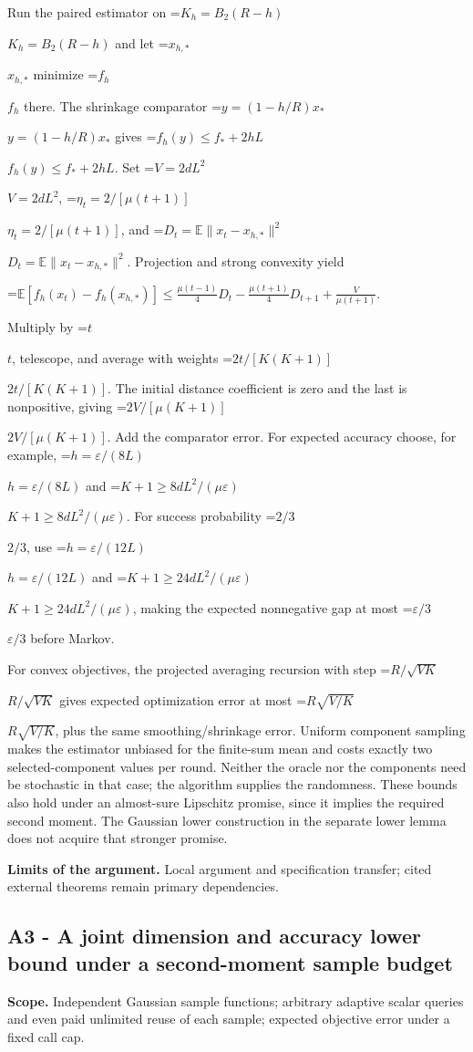 \documentclass[10pt,a4paper]{article}
\newcommand{\AtlasMath}[1]{\par\begingroup\centering\setbox0=\hbox{$\displaystyle #1$}\ifdim\wd0>1.4\linewidth\typeout{ATLAS WIDE FORMULA: \the\wd0}\fi\ifdim\wd0>\linewidth\resizebox{\linewidth}{!}{\box0}\else\box0\fi\par\endgroup}
\newcommand{\AtlasInlineMath}[1]{\begingroup\setbox0=\hbox{$#1$}\ifdim\wd0>.4\linewidth\endgroup\AtlasMath{#1}\else\endgroup$#1$\fi}
\begin{document}
Run the paired estimator on \AtlasInlineMath{K_h=B_2(R-h)} and let \AtlasInlineMath{x_{h,*}} minimize \AtlasInlineMath{f_h} there. The shrinkage comparator \AtlasInlineMath{y=(1-h/R)x_*} gives \AtlasInlineMath{f_h(y)\le f_*+2hL}. Set \AtlasInlineMath{V=2dL^2}, \AtlasInlineMath{\eta_t=2/[\mu(t+1)]}, and \AtlasInlineMath{D_t=\mathbb E\|x_t-x_{h,*}\|^2}. Projection and strong convexity yield

\AtlasMath{\mathbb E[f_h(x_t)-f_h(x_{h,*})]\le\frac{\mu(t-1)}4D_t-\frac{\mu(t+1)}4D_{t+1}+\frac{V}{\mu(t+1)}.}

Multiply by \AtlasInlineMath{t}, telescope, and average with weights \AtlasInlineMath{2t/[K(K+1)]}. The initial distance coefficient is zero and the last is nonpositive, giving \AtlasInlineMath{2V/[\mu(K+1)]}. Add the comparator error. For expected accuracy choose, for example, \AtlasInlineMath{h=\varepsilon/(8L)} and \AtlasInlineMath{K+1\ge8dL^2/(\mu\varepsilon)}. For success probability \AtlasInlineMath{2/3}, use \AtlasInlineMath{h=\varepsilon/(12L)} and \AtlasInlineMath{K+1\ge24dL^2/(\mu\varepsilon)}, making the expected nonnegative gap at most \AtlasInlineMath{\varepsilon/3} before Markov.

For convex objectives, the projected averaging recursion with step \AtlasInlineMath{R/\sqrt{VK}} gives expected optimization error at most \AtlasInlineMath{R\sqrt{V/K}}, plus the same smoothing/shrinkage error. Uniform component sampling makes the estimator unbiased for the finite-sum mean and costs exactly two selected-component values per round. Neither the oracle nor the components need be stochastic in that case; the algorithm supplies the randomness. These bounds also hold under an almost-sure Lipschitz promise, since it implies the required second moment. The Gaussian lower construction in the separate lower lemma does not acquire that stronger promise.

\textbf{Limits of the argument.} Local argument and specification transfer; cited external theorems remain primary dependencies.

\subsection{A3 - A joint dimension and accuracy lower bound under a second-moment sample budget}
\textbf{Scope.} Independent Gaussian sample functions; arbitrary adaptive scalar queries and even paid unlimited reuse of each sample; expected objective error under a fixed call cap.
\end{document}
